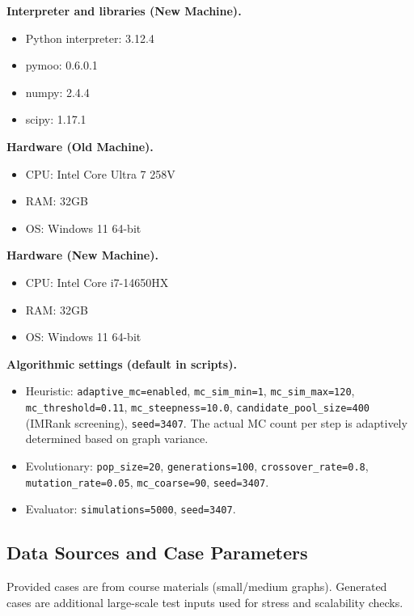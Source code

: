 \documentclass[onecolumn,a4paper,12pt]{IEEEtran}
\begin{document}
\textbf{Interpreter and libraries (New Machine).}
\begin{itemize}
        \item Python interpreter: 3.12.4
        \item pymoo: 0.6.0.1
        \item numpy: 2.4.4
        \item scipy: 1.17.1
\end{itemize}

\textbf{Hardware (Old Machine).}
\begin{itemize}
        \item CPU: Intel Core Ultra 7 258V
        \item RAM: 32GB
        \item OS: Windows 11 64-bit
\end{itemize}

\textbf{Hardware (New Machine).}
\begin{itemize}
        \item CPU: Intel Core i7-14650HX
        \item RAM: 32GB
        \item OS: Windows 11 64-bit
\end{itemize}

\textbf{Algorithmic settings (default in scripts).}
\begin{itemize}
        \item Heuristic: \texttt{adaptive\_mc=enabled}, \texttt{mc\_sim\_min=1}, \texttt{mc\_sim\_max=120}, \texttt{mc\_threshold=0.11}, \texttt{mc\_steepness=10.0}, \texttt{candidate\_pool\_size=400} (IMRank screening), \texttt{seed=3407}. The actual MC count per step is adaptively determined based on graph variance.
        \item Evolutionary: \texttt{pop\_size=20}, \texttt{generations=100}, \texttt{crossover\_rate=0.8}, \\ \texttt{mutation\_rate=0.05}, \texttt{mc\_coarse=90}, \texttt{seed=3407}.
        \item Evaluator: \texttt{simulations=5000}, \texttt{seed=3407}.
\end{itemize}

\subsection{Data Sources and Case Parameters}\label{sec:data_sources}
Provided cases are from course materials (small/medium graphs). Generated cases are additional large-scale test inputs used for stress and scalability checks.
\end{document}
